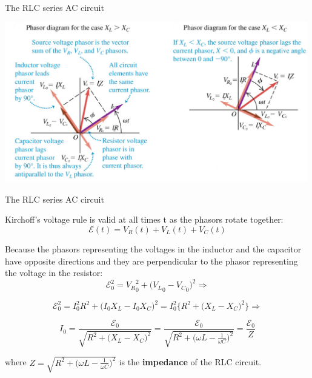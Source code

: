 %
%
%

\begin{frame}{The RLC series AC circuit}

\begin{center}
   \includegraphics[width=0.99\textwidth]{./images/schematics/ac_rlc_phasor_diagram_02.png}\\
\end{center}


\end{frame}

%
%
%

\begin{frame}{The RLC series AC circuit}

Kirchoff's voltage rule is valid at all times t as the phasors rotate together:
\begin{equation*}
    \mathcal{E}(t) = V_R(t) + V_L(t)  + V_C(t)
\end{equation*}

Because the phasors representing the voltages in the inductor and the capacitor have opposite directions
and they are perpendicular to the phasor representing the voltage in the resistor:
\begin{equation*}
    \mathcal{E}_0^2 = {V_R}_0^2 + \Big( {V_L}_0 - {V_C}_0 \Big)^2  \Rightarrow
\end{equation*}

\begin{equation*}
    \mathcal{E}_0^2 = I_0^2 R^2 + \Big( I_0 X_L - I_0 X_C \Big)^2 = I_0^2 \Big\{ R^2 + \Big( X_L - X_C \Big)^2  \Big\} \Rightarrow
\end{equation*}

\begin{equation*}
        I_0 = \frac{\mathcal{E}_0}{\sqrt{R^2 + \Big( X_L - X_C \Big)^2}} =
                 \frac{\mathcal{E}_0}{\sqrt{R^2 + \Big( \omega L - \frac{1}{\omega C} \Big)^2}} =
                 \frac{\mathcal{E}_0}{Z}
\end{equation*}

where {\color{magenta} $\displaystyle Z = \sqrt{R^2 + \Big( \omega L - \frac{1}{\omega C} \Big)^2}$}
is the {\bf impedance} of the RLC circuit.\\

\end{frame}

